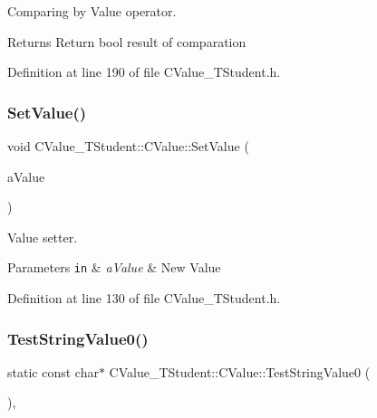 Comparing by Value operator. 

\begin{DoxyReturn}{Returns}
Return {\ttfamily bool} result of comparation 
\end{DoxyReturn}


Definition at line 190 of file C\+Value\+\_\+\+T\+Student.\+h.

\mbox{\label{class_c_value___t_student_1_1_c_value_a1fcbd9b398c97c4365de889a533c90e1}} 
\subsubsection{\texorpdfstring{Set\+Value()}{SetValue()}}
{\footnotesize\ttfamily void C\+Value\+\_\+\+T\+Student\+::\+C\+Value\+::\+Set\+Value (\begin{DoxyParamCaption}\item[{const \hyperlink{struct_c_value___t_student_1_1_t_student}{T\+Student}}]{a\+Value }\end{DoxyParamCaption})\hspace{0.3cm}{\ttfamily [inline]}}



Value setter. 


\begin{DoxyParams}[1]{Parameters}
\mbox{\tt in}  & {\em a\+Value} & New Value \\
\hline
\end{DoxyParams}


Definition at line 130 of file C\+Value\+\_\+\+T\+Student.\+h.

\mbox{\label{class_c_value___t_student_1_1_c_value_a7a3fba914631fd789942450660718a32}} 
\subsubsection{\texorpdfstring{Test\+String\+Value0()}{TestStringValue0()}}
{\footnotesize\ttfamily static const char$\ast$ C\+Value\+\_\+\+T\+Student\+::\+C\+Value\+::\+Test\+String\+Value0 (\begin{DoxyParamCaption}{ }\end{DoxyParamCaption})\hspace{0.3cm}{\ttfamily [inline]}, {\ttfamily [static]}}



